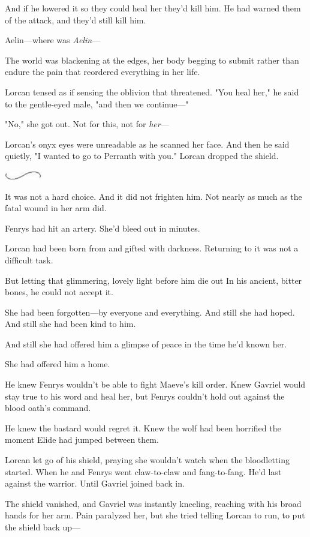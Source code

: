 And if he lowered it so they could heal her  they'd kill him. He had warned them of the attack, and they'd still kill him.

Aelin---where was \emph{Aelin}---

The world was blackening at the edges, her body begging to submit rather than endure the pain that reordered everything in her life.

Lorcan tensed as if sensing the oblivion that threatened. "You heal her," he said to the gentle-eyed male, "and then we continue---"

"No," she got out. Not for this, not for \emph{her}---

Lorcan's onyx eyes were unreadable as he scanned her face. And then he said quietly, "I wanted to go to Perranth with you." Lorcan dropped the shield.

\includegraphics[width=0.65in,height=0.13in]{images/seperator}

It was not a hard choice. And it did not frighten him. Not nearly as much as the fatal wound in her arm did.

Fenrys had hit an artery. She'd bleed out in minutes.

Lorcan had been born from and gifted with darkness. Returning to it was not a difficult task.

But letting that glimmering, lovely light before him die out  In his ancient, bitter bones, he could not accept it.

She had been forgotten---by everyone and everything. And still she had hoped. And still she had been kind to him.

And still she had offered him a glimpse of peace in the time he'd known her.

She had offered him a home.

He knew Fenrys wouldn't be able to fight Maeve's kill order. Knew Gavriel would stay true to his word and heal her, but Fenrys couldn't hold out against the blood oath's command.

He knew the bastard would regret it. Knew the wolf had been horrified the moment Elide had jumped between them.

Lorcan let go of his shield, praying she wouldn't watch when the bloodletting started. When he and Fenrys went claw-to-claw and fang-to-fang. He'd last against the warrior. Until Gavriel joined back in.

The shield vanished, and Gavriel was instantly kneeling, reaching with his broad hands for her arm. Pain paralyzed her, but she tried telling Lorcan to run, to put the shield back up---

